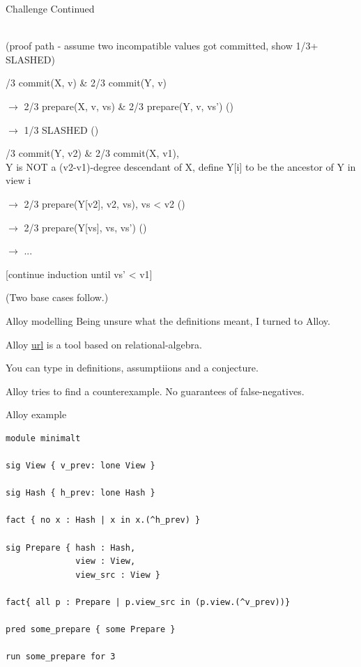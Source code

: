 \documentclass{beamer}
\begin{document}
\begin{frame}{Challenge Continued}

  \\ (proof path - assume two incompatible values got committed, show 1/3+ SLASHED)


/3 commit(X, v) \& 2/3 commit(Y, v)

$\rightarrow$ 2/3 prepare(X, v, vs) \& 2/3 prepare(Y, v, vs')  ()

$\rightarrow$ 1/3 SLASHED ()


/3 commit(Y, v2) \& 2/3 commit(X, v1),\\ Y is NOT a (v2-v1)-degree descendant of X, define Y[i] to be the ancestor of Y in view i

$\rightarrow$ 2/3 prepare(Y[v2], v2, vs), vs < v2 ()

$\rightarrow$ 2/3 prepare(Y[vs], vs, vs') ()

$\rightarrow$ ...

[continue induction until vs' < v1]

(Two base cases follow.)

\end{frame}

\begin{frame}{Alloy modelling}
Being unsure what the definitions meant, I turned to Alloy.

Alloy \url{url} is a tool based on relational-algebra.

You can type in definitions, assumptiions and a conjecture.

Alloy tries to find a counterexample.  No guarantees of false-negatives.
\end{frame}

\begin{frame}[fragile]{Alloy example}

\begin{verbatim}
module minimalt

sig View { v_prev: lone View }

sig Hash { h_prev: lone Hash }

fact { no x : Hash | x in x.(^h_prev) }

sig Prepare { hash : Hash,
              view : View,
              view_src : View }

fact{ all p : Prepare | p.view_src in (p.view.(^v_prev))}

pred some_prepare { some Prepare }

run some_prepare for 3
\end{verbatim}

\end{frame}
\end{document}
